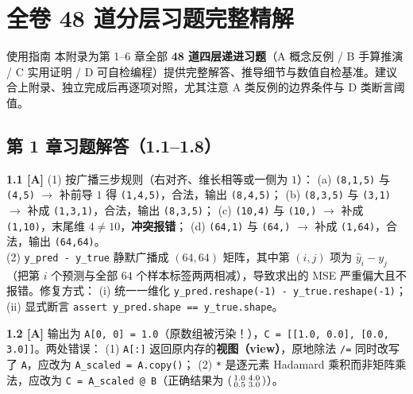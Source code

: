 \chapter{全卷 48 道分层习题完整精解}
\label{app:solutions}


\begin{chapIntro}{使用指南}
本附录为第 1--6 章全部 \textbf{48 道四层递进习题}（A 概念反例 / B 手算推演 / C 实用证明 / D 可自检编程）提供完整解答、推导细节与数值自检基准。建议合上附录、独立完成后再逐项对照，尤其注意 A 类反例的边界条件与 D 类断言阈值。
\end{chapIntro}

\section{第 1 章习题解答（1.1--1.8）}

\textbf{1.1 [A]}
(1) 按广播三步规则（右对齐、维长相等或一侧为 $1$）：
(a) \texttt{(8,1,5)} 与 \texttt{(4,5)} $\to$ 补前导 $1$ 得 \texttt{(1,4,5)}，合法，输出 \texttt{(8,4,5)}；
(b) \texttt{(8,3,5)} 与 \texttt{(3,1)} $\to$ 补成 \texttt{(1,3,1)}，合法，输出 \texttt{(8,3,5)}；
(c) \texttt{(10,4)} 与 \texttt{(10,)} $\to$ 补成 \texttt{(1,10)}，末尾维 $4\neq 10$，\textbf{冲突报错}；
(d) \texttt{(64,1)} 与 \texttt{(64,)} $\to$ 补成 \texttt{(1,64)}，合法，输出 \texttt{(64,64)}。\\
(2) \texttt{y\_pred - y\_true} 静默广播成 $(64,64)$ 矩阵，其中第 $(i,j)$ 项为 $\hat{y}_i - y_j$（把第 $i$ 个预测与全部 $64$ 个样本标签两两相减），导致求出的 MSE 严重偏大且不报错。修复方式：
(i) 统一一维化 \texttt{y\_pred.reshape(-1) - y\_true.reshape(-1)}；
(ii) 显式断言 \texttt{assert y\_pred.shape == y\_true.shape}。

\textbf{1.2 [A]}
输出为 \texttt{A[0, 0] = 1.0}（原数组被污染！），\texttt{C = [[1.0, 0.0], [0.0, 3.0]]}。两处错误：
(1) \texttt{A[:]} 返回原内存的\textbf{视图（view）}，原地除法 \texttt{/=} 同时改写了 \texttt{A}，应改为 \texttt{A\_scaled = A.copy()}；
(2) \texttt{*} 是逐元素 Hadamard 乘积而非矩阵乘法，应改为 \texttt{C = A\_scaled @ B}（正确结果为 $\begin{psmallmatrix}1.0 & 4.0\\ 0.5 & 3.0\end{psmallmatrix}$）。


